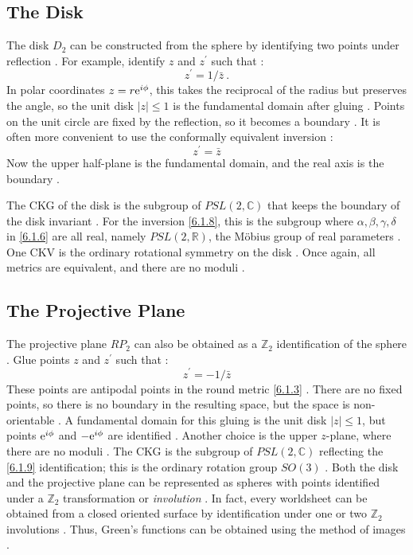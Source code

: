 \subsection*{The Disk}

The disk $D_2$ can be constructed from the sphere by identifying two points under reflection . For example, identify $z$ and $z^{\prime}$ such that :
\begin{equation}
	z^{\prime}=1 / \bar{z} \:. \label{6.1.7}
\end{equation}
In polar coordinates $z=r \mathrm{e}^{i \phi}$, this takes the reciprocal of the radius but preserves the angle, so the unit disk $|z| \leq 1$ is the fundamental domain after gluing . Points on the unit circle are fixed by the reflection, so it becomes a boundary . It is often more convenient to use the conformally equivalent inversion :
\begin{equation}
	z^{\prime}=\bar{z}  \label{6.1.8}
\end{equation}
Now the upper half-plane is the fundamental domain, and the real axis is the boundary .

The CKG of the disk is the subgroup of $PSL(2, \mathds{C})$ that keeps the boundary of the disk invariant . For the inversion \eqref{6.1.8}, this is the subgroup where $\alpha, \beta, \gamma, \delta$ in \eqref{6.1.6} are all real, namely $PSL(2, \mathds{R})$, the Möbius group of real parameters . One CKV is the ordinary rotational symmetry on the disk . Once again, all metrics are equivalent, and there are no moduli .

\subsection*{The Projective Plane}

The projective plane $RP_2$ can also be obtained as a $\mathds{Z}_{2}$ identification of the sphere . Glue points $z$ and $z^{\prime}$ such that :
\begin{equation}
	z^{\prime}=-1 / \bar{z} \label{6.1.9}
\end{equation}
These points are antipodal points in the round metric \eqref{6.1.3} . There are no fixed points, so there is no boundary in the resulting space, but the space is non-orientable . A fundamental domain for this gluing is the unit disk $|z| \leq 1$, but points $\mathrm{e}^{i \phi}$ and $-\mathrm{e}^{i \phi}$ are identified . Another choice is the upper $z$-plane, where there are no moduli . The CKG is the subgroup of $PSL(2, \mathds{C})$ reflecting the \eqref{6.1.9} identification; this is the ordinary rotation group $SO(3)$ . Both the disk and the projective plane can be represented as spheres with points identified under a $\mathds{Z}_{2}$ transformation or \emph{involution} . In fact, every worldsheet can be obtained from a closed oriented surface by identification under one or two $\mathds{Z}_{2}$ involutions . Thus, Green's functions can be obtained using the method of images .

